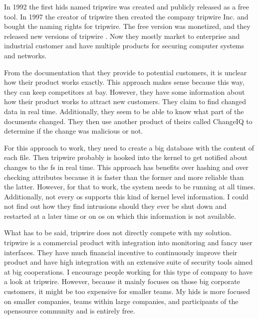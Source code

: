 In 1992 the first \gls{hids} named \gls{tripwire} was created and publicly released as a free tool. In 1997 the creator of \gls{tripwire} then created the company \Gls{tripwire} Inc. and bought the naming rights for \gls{tripwire}. The free version was monetized, and they released new versions of \gls{tripwire} \cite{Tripwire:Impl, Tripwire:company}. Now they mostly market to enterprise and industrial customer and have multiple products for securing computer systems and networks. \cite{tripwire}

From the documentation that they provide to potential customers, it is unclear how their product works exactly. This approach makes sense because this way, they can keep competitors at bay. However, they have some information about how their product works to attract new customers. They claim to find changed data in real time. Additionally, they seem to be able to know what part of the documents changed. They then use another product of theirs called ChangeIQ to determine if the change was malicious or not. \cite{tripwire:fim:datasheet, tripwire:true:intent}

For this approach to work, they need to create a big database with the content of each file. Then \gls{tripwire} probably is hooked into the kernel to get notified about changes to the \gls{fs} in real time. This approach has benefits over hashing and over checking attributes because it is faster than the former and more reliable than the latter. However, for that to work, the system needs to be running at all times. Additionally, not every \gls{os} supports this kind of kernel level information. I could not find out how they find \glspl{intrusion} should they ever be shut down and restarted at a later time or on \gls{os} on which this information is not available. 

What has to be said, \gls{tripwire} does not directly compete with my solution. \Gls{tripwire} is a commercial product with integration into monitoring and fancy user interfaces. They have much financial incentive to continuously improve their product and have high integration with an extensive suite of security tools aimed at big cooperations. I encourage people working for this type of company to have a look at \gls{tripwire}. However, because it mainly focuses on those big corporate customers, it might be too expensive for smaller teams. My \gls{hids} is more focused on smaller companies, teams within large companies, and participants of the \gls{opensource} community and is entirely free.


